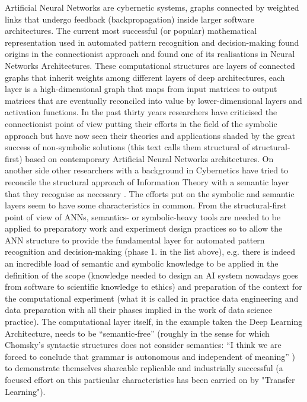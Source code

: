 \documentclass[14pt,a4paper]{extarticle}
\begin{document}
\hspace*{15mm}Artificial Neural Networks are cybernetic systems, graphs connected by weighted links that undergo feedback (backpropagation) inside larger software architectures.
\newline
\hspace*{15mm}The current most successful (or popular) mathematical representation used in automated pattern recognition and decision-making found origins in the connectionist approach \cite{PlatoConnectionism} and found one of its realisations in Neural Networks Architectures. These computational structures are layers of connected graphs that inherit weights among different layers of deep architectures, each layer is a high-dimensional graph that maps from input matrices to output matrices that are eventually reconciled into value by lower-dimensional layers and activation functions.
\newline
\hspace*{15mm}In the past thirty years researchers have criticised the connectionist point of view putting their efforts in the field of the symbolic approach \cite{WIKIsymbolic,SUNsymconn} but have now seen their theories and applications shaded by the great success of non-symbolic solutions (this text calls them structural of structural-first) based on contemporary Artificial Neural Networks architectures. On another side other researchers with a background in Cybernetics have tried to reconcile the structural approach of Information Theory with a semantic layer that they recognise as necessary \cite{leydesdorff2021evolutionary}. The efforts put on the symbolic and semantic layers seem to have some characteristics in common.
\newline
From the structural-first point of view of ANNs, semantics- or symbolic-heavy tools are needed to be applied to preparatory work and experiment design practices so to allow the ANN structure to provide the fundamental layer for automated pattern recognition and decision-making (phase 1. in the list above), e.g. there is indeed an incredible load of semantic and symbolic knowledge to be applied in the definition of the scope (knowledge needed to design an AI system nowadays goes from software to scientific knowledge to ethics) and preparation of the context for the computational experiment (what it is called in practice data engineering and data preparation with all their phases implied in the work of data science practice). The computational layer itself, in the example taken the Deep Learning Architecture, needs to be “semantic-free” (roughly in the sense for which Chomsky’s syntactic structures does not consider semantics: “I think we are forced to conclude that grammar is autonomous and independent of meaning” \cite{chomsky2015syntactic}) to demonstrate themselves shareable replicable and industrially successful (a focused effort on this particular characteristics has been carried on by "Transfer Learning").
\end{document}
